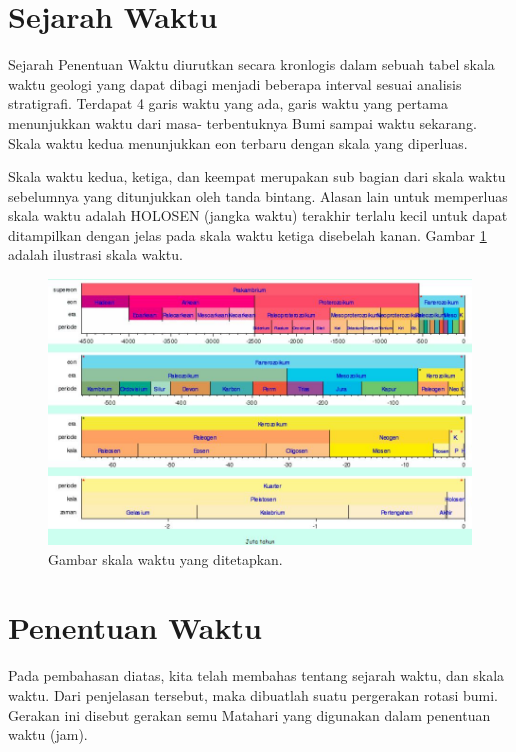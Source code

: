 

\section{Sejarah Waktu}
Sejarah Penentuan Waktu diurutkan secara kronlogis dalam sebuah tabel skala waktu geologi 
yang dapat dibagi menjadi beberapa interval sesuai analisis stratigrafi. 
Terdapat 4 garis waktu yang ada, garis waktu yang pertama menunjukkan waktu dari masa-
terbentuknya Bumi sampai waktu sekarang\cite{suryasejarah}. 
Skala waktu kedua menunjukkan eon terbaru dengan skala yang diperluas.

Skala waktu kedua, ketiga, dan keempat merupakan sub bagian 
dari skala waktu sebelumnya yang ditunjukkan oleh tanda bintang. 
Alasan lain untuk memperluas skala waktu adalah HOLOSEN (jangka waktu) terakhir 
terlalu kecil untuk dapat ditampilkan dengan jelas
pada skala waktu ketiga disebelah kanan. Gambar \ref{sejarahpenentuan} adalah ilustrasi skala waktu.

\begin{figure}[ht]
\centerline{\includegraphics[width=1\textwidth]{figures/sejarahpenentuan.JPG}}
\caption{Gambar skala waktu yang ditetapkan.}
\label{sejarahpenentuan}
\end{figure}

\section{Penentuan Waktu}
Pada pembahasan diatas, kita telah membahas tentang sejarah waktu, dan skala waktu. 
Dari penjelasan tersebut, maka dibuatlah suatu pergerakan rotasi bumi. 
Gerakan ini disebut gerakan semu Matahari yang digunakan dalam penentuan waktu (jam).

